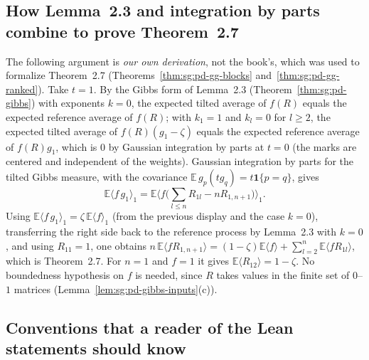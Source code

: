 \begin{enumerate}
\end{enumerate}

\subsection*{How Lemma~2.3 and integration by parts combine to prove Theorem~2.7}

The following argument is \emph{our own derivation}, not the book's, which was used to formalize Theorem~2.7 (Theorems~\ref{thm:sg:pd-gg-blocks} and~\ref{thm:sg:pd-gg-ranked}). Take $t=1$. By the Gibbs form of Lemma~2.3 (Theorem~\ref{thm:sg:pd-gibbs}) with exponents $k=0$, the expected tilted average of $f(R)$ equals the expected reference average of $f(R)$; with $k_1=1$ and $k_l=0$ for $l\ge2$, the expected tilted average of $f(R)(g_1-\zeta)$ equals the expected reference average of $f(R)g_1$, which is $0$ by Gaussian integration by parts at $t=0$ (the marks are centered and independent of the weights). Gaussian integration by parts for the tilted Gibbs measure, with the covariance $\mathbb E\,g_p(tg_q)=t\mathbf 1\{p=q\}$, gives
\[\mathbb E\langle f\,g_1\rangle_1=\mathbb E\Big\langle f\Big(\sum_{l\le n}R_{1l}-nR_{1,n+1}\Big)\Big\rangle_1.\]
Using $\mathbb E\langle f\,g_1\rangle_1=\zeta\,\mathbb E\langle f\rangle_1$ (from the previous display and the case $k=0$), transferring the right side back to the reference process by Lemma~2.3 with $k=0$, and using $R_{11}=1$, one obtains $n\,\mathbb E\langle fR_{1,n+1}\rangle=(1-\zeta)\mathbb E\langle f\rangle+\sum_{l=2}^n\mathbb E\langle fR_{1l}\rangle$, which is Theorem~2.7. For $n=1$ and $f=1$ it gives $\mathbb E\langle R_{12}\rangle=1-\zeta$. No boundedness hypothesis on $f$ is needed, since $R$ takes values in the finite set of $0$--$1$ matrices (Lemma~\ref{lem:sg:pd-gibbs-inputs}(c)).

\subsection*{Conventions that a reader of the Lean statements should know}


